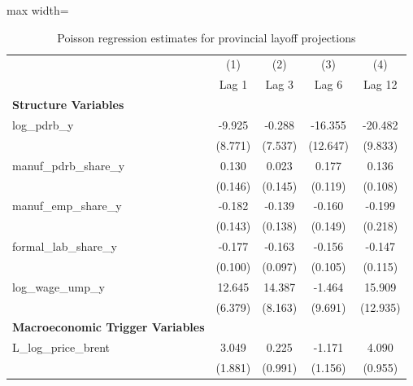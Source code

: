 \begin{table}[H]\centering
\caption{Poisson regression estimates for provincial layoff projections}
\small
\renewcommand{\arraystretch}{1.15}
\begin{adjustbox}{max width=\textwidth}
\begin{tabular}{l*{4}{c}}
\toprule
& (1) & (2) & (3) & (4) \\ & Lag 1 & Lag 3 & Lag 6 & Lag 12 \\ \midrule
\addlinespace\textbf{Structure Variables}&                     &                     &                     &                     \\
log\_pdrb\_y  &      -9.925         &      -0.288         &     -16.355         &     -20.482\sym{*}  \\
            &     (8.771)         &     (7.537)         &    (12.647)         &     (9.833)         \\
manuf\_pdrb\_share\_y&       0.130         &       0.023         &       0.177         &       0.136         \\
            &     (0.146)         &     (0.145)         &     (0.119)         &     (0.108)         \\
manuf\_emp\_share\_y&      -0.182         &      -0.139         &      -0.160         &      -0.199         \\
            &     (0.143)         &     (0.138)         &     (0.149)         &     (0.218)         \\
formal\_lab\_share\_y&      -0.177         &      -0.163         &      -0.156         &      -0.147         \\
            &     (0.100)         &     (0.097)         &     (0.105)         &     (0.115)         \\
log\_wage\_ump\_y&      12.645\sym{*}  &      14.387         &      -1.464         &      15.909         \\
            &     (6.379)         &     (8.163)         &     (9.691)         &    (12.935)         \\
\addlinespace\textbf{Macroeconomic Trigger Variables}&                     &                     &                     &                     \\
L\_log\_price\_brent&       3.049         &       0.225         &      -1.171         &       4.090\sym{***}\\
            &     (1.881)         &     (0.991)         &     (1.156)         &     (0.955)         \\

\end{tabular}
\end{adjustbox}
\end{table}

